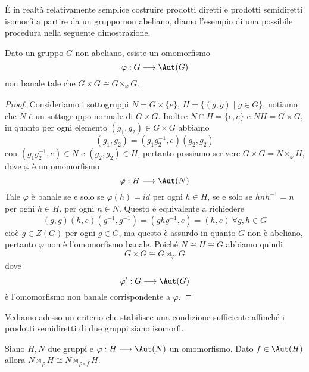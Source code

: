 \documentclass[11pt]{scrartcl}
\begin{document}
È in realtà relativamente semplice costruire prodotti diretti e prodotti semidiretti
isomorfi a partire da un gruppo non abeliano, diamo l'esempio di una possibile
procedura nella seguente dimostrazione.

\begin{proposition}
    Dato un gruppo $G$ non abeliano, esiste un omomorfismo
    \[
        \varphi: G\longrightarrow \Aut(G)
    \]
    non banale tale che $G\times G \cong G\rtimes_{\varphi} G$.
\end{proposition}

\begin{proof}
    Consideriamo i sottogruppi $N = G\times\{e\}$, $H = \{(g, g) \mid g \in G\}$,
    notiamo che $N$ è un sottogruppo normale di $G\times G$. Inoltre 
    $N\cap H = \{e, e\}$ e $NH = G\times G$, in quanto per 
    ogni elemento $(g_1, g_2) \in G\times G$ abbiamo
    \[
        (g_1, g_2) = (g_1g_2^{-1}, e)(g_2, g_2)
    \]
    con $(g_1g_2^{-1}, e) \in N$ e $(g_2, g_2) \in H$, pertanto possiamo 
    scrivere $G \times G = N \rtimes_{\varphi} H$, dove $\varphi$ è un omomorfismo
    \[
        \varphi: H \longrightarrow \Aut(N)
    \]
    Tale $\varphi$ è banale se e solo se $\varphi(h) = id$ per ogni $h \in H$,
    se e solo se $hnh^{-1} = n$ per ogni $h \in H$, per ogni $n \in N$.
    Questo è equivalente a richiedere 
    \[
        (g, g)(h, e)(g^{-1}, g^{-1}) = (ghg^{-1}, e)= (h, e)~\forall g, h \in G
    \]
    cioè $g \in Z(G)$ per ogni $g \in G$,
    ma questo è assurdo in quanto $G$ non è abeliano, pertanto $\varphi$
    non è l'omomorfismo banale. Poiché $N \cong H \cong G$ abbiamo quindi
    \[
        G \times G \cong G\rtimes_{\varphi'}G
    \]
    dove
    \[
        \varphi':G \longrightarrow \Aut(G)
    \]
    è l'omomorfismo non banale corrispondente a $\varphi$.
\end{proof}

Vediamo adesso un criterio che stabilisce una condizione sufficiente affinché 
i prodotti semidiretti di due gruppi siano isomorfi.

\begin{proposition}
    \label{prop1.74}
    Siano $H, N$ due gruppi e $\varphi: H \longrightarrow \Aut(N)$ un omomorfismo.
    Dato $f \in \Aut(H)$ allora $N\rtimes_{\varphi} H \cong N\rtimes_{\varphi\circ f} H$.
\end{proposition}
\end{document}
